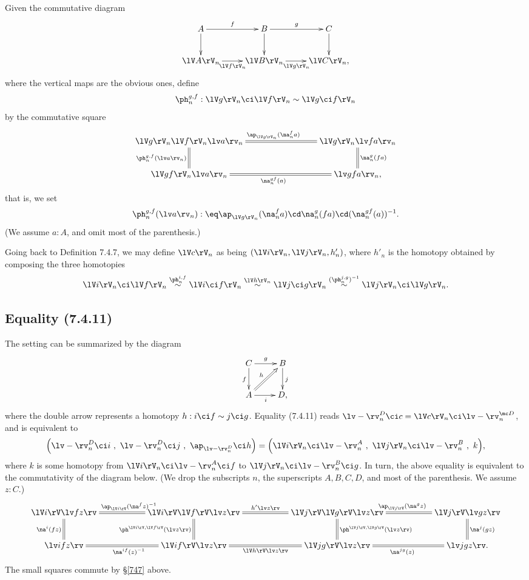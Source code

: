 \documentclass[12pt]{article}
\begin{document}
Given the commutative diagram
$$
\xymatrix{
A\ar[r]^f\ar[d]&B\ar[r]^g\ar[d]&C\ar[d]\\
\lV A\rV_n\ar[r]_{\lV f\rV_n}&\lV B\rV_n\ar[r]_{\lV g\rV_n}&\lV C\rV_n,}
$$ 
where the vertical maps are the obvious ones, define 
$$
\ph_n^{g,f}:\lV g\rV_n\ci\lV f\rV_n\sim\lV g\ci f\rV_n
$$ 
by the commutative square 
$$
\xymatrix{
\lV g\rV_n\lV f\rV_n\lv a\rv_n\ar@{=}[d]_{\ph_n^{g,f}(\lv a\rv_n)}\ar@{=}[rrr]^{\ap_{\lV g\rV_n}(\na_n^fa)}&&&
\lV g\rV_n\lv fa\rv_n\ar@{=}[d]^{\na_n^g(fa)}\\
\lV gf\rV_n\lv a\rv_n\ar@{=}[rrr]_{\na_n^{gf}(a)}&&&\lv gfa\rv_n,}
$$ 
that is, we set 
$$
\ph_n^{g,f}(\lv a\rv_n):\eq\ap_{\lV g\rV_n}(\na_n^fa)\cd\na_n^g(fa)\cd(\na_n^{gf}(a))^{-1}.
$$ 
(We assume $a:A$, and omit most of the parenthesis.)

Going back to Definition 7.4.7, we may define $\lV c\rV_n$ as being $(\lV i\rV_n,\lV j\rV_n,h'_n)$, where $h'_n$ is the homotopy obtained by composing the three homotopies
$$
\lV i\rV_n\ci\lV f\rV_n\overset{\ph_n^{i,f}}{\sim}\lV i\ci f\rV_n\overset{\lV h\rV_n}{\sim}\lV j\ci g\rV_n\overset{(\ph_n^{j,g})^{-1}}{\sim}\lV j\rV_n\ci\lV g\rV_n.
$$


\subsection{Equality (7.4.11)}

The setting can be summarized by the diagram 
$$
\xymatrix{C\ar[r]^g\ar[d]_f&B\ar[d]^j\\ A\ar[r]_i\ar@{=>}[ur]^h&D,}
$$ 
where the double arrow represents a homotopy $h:i\ci f\sim j\ci g$. Equality (7.4.11) reads $\lv-\rv^D_n\ci c=\lV c\rV_n\ci\lv-\rv^{\mc D}_n$, and is equivalent to
$$
\Big(\lv-\rv^D_n\ci i\ ,\ \lv-\rv^D_n\ci j\ ,\ \ap_{\lv-\rv^D_n}\ci h\Big)
=
\Big(\lV i\rV_n\ci\lv-\rv^A_n\ ,\ \lV j\rV_n\ci\lv-\rv^B_n\ ,\ k\Big),
$$ 
where $k$ is some homotopy from $\lV i\rV_n\ci\lv-\rv^A_n\ci f$ to $\lV j\rV_n\ci\lv-\rv^B_n\ci g$. In turn, the above equality is equivalent to the commutativity of the diagram below. (We drop the subscripts $n$, the superscripts $A,B,C,D$, and most of the parenthesis. We assume $z:C$.) 
$$ 
\xymatrix{
\lV i\rV\lv fz\rv\ar@{=}[d]_{\na^i(fz)}&&
\lV i\rV\lV f\rV\lv z\rv\ar@{=}[ll]_{\ap_{\lV i\rV}(\na^fz)^{-1}}\ar@{=}[d]_{\ph^{\lV i\rV,\lV f\rV}(\lv z\rv)}\ar@{=}[rr]^{h'\lv z\rv}&&
\lV j\rV\lV g\rV\lv z\rv\ar@{=}[d]^{\ph^{\lV j\rV,\lV g\rV}(\lv z\rv)}\ar@{=}[rr]^{\ap_{\lV j\rV}(\na^gz)}&&
\lV j\rV\lv gz\rv\ar@{=}[d]^{\na^j(gz)}\\
%
\lv ifz\rv&&\lV if\rV\lv z\rv\ar@{=}[rr]_{\lV h\rV\lv z\rv}\ar@{=}[ll]^{\na^{if}(z)^{-1}}&&\lV jg\rV\lv z\rv\ar@{=}[rr]_{\na^{jg}(z)}&&\lv jgz\rv.}
$$ 
The small squares commute by \S\ref{747} above.
\end{document}
